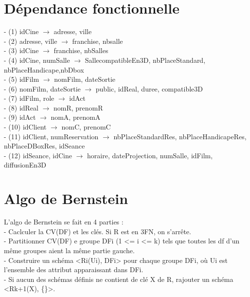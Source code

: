 \documentclass[a4paper,sffamily,12pt]{article}
\begin{document}
	\section{Dépendance fonctionnelle}
	
		\vspace{0.5cm}
	
		\noindent- (1) idCine $\rightarrow$ adresse, ville \\
		- (2) adresse, ville $\rightarrow$ franchise, nbsalle \\
		- (3) idCine $\rightarrow$ franchise, nbSalles \\
		- (4) idCine, numSalle $\rightarrow$ SallecompatibleEn3D, nbPlaceStandard, nbPlaceHandicape,nbDbox \\
 		- (5) idFilm $\rightarrow$ nomFilm, dateSortie \\
		- (6) nomFilm, dateSortie $\rightarrow$ public, idReal, duree, compatible3D \\
		- (7) idFilm, role $\rightarrow$  idAct \\
		- (8) idReal $\rightarrow$ nomR, prenomR \\
		- (9) idAct $\rightarrow$ nomA, prenomA \\
		- (10) idClient $\rightarrow$ nomC, prenomC \\
		- (11) idClient, numReservation $\rightarrow$ nbPlaceStandardRes, nbPlaceHandicapeRes, nbPlaceDBoxRes, idSeance \\
		- (12) idSeance, idCine $\rightarrow$ horaire, dateProjection, numSalle, idFilm, diffusionEn3D \\
		
	\section{Algo de Bernstein}
	
		\vspace{0.5cm}

		\noindent L'algo de Bernstein se fait en 4 parties : \\
			- Caclculer la CV(DF) et les clés. Si R est en 3FN, on s'arrête. \\
			- Partitionner CV(DF) e groupe DFi (1 <= i <= k) tels que toutes les df d'un même groupes aient la même partie gauche. \\
			- Construire un schéma <Ri(Ui), DFi> pour chaque groupe DFi, où Ui est l'ensemble des attribut apparaissant dans DFi. \\
			- Si aucun des schémas définis ne contient de clé X de R, rajouter un schéma <Rk+1(X), \{\}>. \\	
\end{document}

